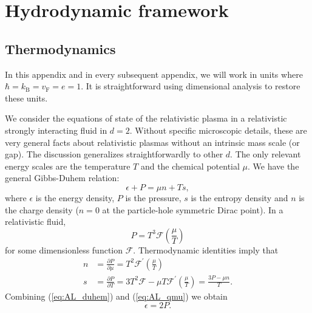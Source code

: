 \chapter{Hydrodynamic framework}
\label{appen:theory}
\section{Thermodynamics}\label{appthermo}
In this appendix and in every subsequent appendix, we will work in units where $\hbar=k_{\mathrm{B}}=v_{\mathrm{F}}=e=1$.     It is straightforward using dimensional analysis to restore these units.  

We consider the equations of state of the relativistic plasma in a relativistic strongly interacting fluid in $d=2$.    Without specific microscopic details, these are very general facts about relativistic plasmas without an intrinsic mass scale (or gap).  The discussion generalizes straightforwardly to other $d$.    The only relevant energy scales are the temperature $T$ and the chemical potential $\mu$.     We have the general Gibbs-Duhem relation:\begin{equation} \label{eq:AL_duhem}
\epsilon + P = \mu n + Ts,
\end{equation}where $\epsilon$ is the energy density, $P$ is the pressure, $s$ is the entropy density and $n$ is the charge density ($n=0$ at the particle-hole symmetric Dirac point).   In a relativistic fluid, \begin{equation}
P  = T^3 \mathcal{F}\left(\frac{\mu}{T}\right)
\end{equation}for some dimensionless function $\mathcal{F}$.  Thermodynamic identities imply that \begin{subequations} \label{eq:AL_qmu}\begin{align}
n &= \frac{\partial P}{\partial \mu} = T^2 \mathcal{F}^\prime \left(\frac{\mu}{T}\right) \\
s &= \frac{\partial P}{\partial T} = 3T^2 \mathcal{F} -  \mu T\mathcal{F}^\prime \left(\frac{\mu}{T}\right) = \frac{3P - \mu n }{T}.
\end{align}\end{subequations}Combining (\ref{eq:AL_duhem}) and (\ref{eq:AL_qmu}) we obtain \begin{equation}
\epsilon = 2P.
\end{equation}

